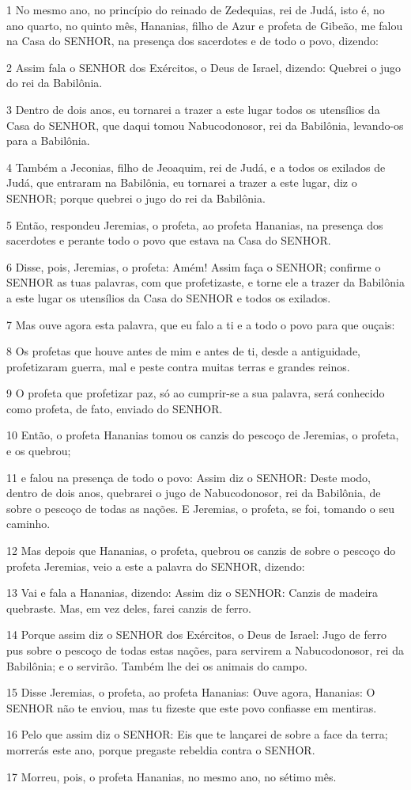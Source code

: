 \par 1 No mesmo ano, no princípio do reinado de Zedequias, rei de Judá, isto é, no ano quarto, no quinto mês, Hananias, filho de Azur e profeta de Gibeão, me falou na Casa do SENHOR, na presença dos sacerdotes e de todo o povo, dizendo:
\par 2 Assim fala o SENHOR dos Exércitos, o Deus de Israel, dizendo: Quebrei o jugo do rei da Babilônia.
\par 3 Dentro de dois anos, eu tornarei a trazer a este lugar todos os utensílios da Casa do SENHOR, que daqui tomou Nabucodonosor, rei da Babilônia, levando-os para a Babilônia.
\par 4 Também a Jeconias, filho de Jeoaquim, rei de Judá, e a todos os exilados de Judá, que entraram na Babilônia, eu tornarei a trazer a este lugar, diz o SENHOR; porque quebrei o jugo do rei da Babilônia.
\par 5 Então, respondeu Jeremias, o profeta, ao profeta Hananias, na presença dos sacerdotes e perante todo o povo que estava na Casa do SENHOR.
\par 6 Disse, pois, Jeremias, o profeta: Amém! Assim faça o SENHOR; confirme o SENHOR as tuas palavras, com que profetizaste, e torne ele a trazer da Babilônia a este lugar os utensílios da Casa do SENHOR e todos os exilados.
\par 7 Mas ouve agora esta palavra, que eu falo a ti e a todo o povo para que ouçais:
\par 8 Os profetas que houve antes de mim e antes de ti, desde a antiguidade, profetizaram guerra, mal e peste contra muitas terras e grandes reinos.
\par 9 O profeta que profetizar paz, só ao cumprir-se a sua palavra, será conhecido como profeta, de fato, enviado do SENHOR.
\par 10 Então, o profeta Hananias tomou os canzis do pescoço de Jeremias, o profeta, e os quebrou;
\par 11 e falou na presença de todo o povo: Assim diz o SENHOR: Deste modo, dentro de dois anos, quebrarei o jugo de Nabucodonosor, rei da Babilônia, de sobre o pescoço de todas as nações. E Jeremias, o profeta, se foi, tomando o seu caminho.
\par 12 Mas depois que Hananias, o profeta, quebrou os canzis de sobre o pescoço do profeta Jeremias, veio a este a palavra do SENHOR, dizendo:
\par 13 Vai e fala a Hananias, dizendo: Assim diz o SENHOR: Canzis de madeira quebraste. Mas, em vez deles, farei canzis de ferro.
\par 14 Porque assim diz o SENHOR dos Exércitos, o Deus de Israel: Jugo de ferro pus sobre o pescoço de todas estas nações, para servirem a Nabucodonosor, rei da Babilônia; e o servirão. Também lhe dei os animais do campo.
\par 15 Disse Jeremias, o profeta, ao profeta Hananias: Ouve agora, Hananias: O SENHOR não te enviou, mas tu fizeste que este povo confiasse em mentiras.
\par 16 Pelo que assim diz o SENHOR: Eis que te lançarei de sobre a face da terra; morrerás este ano, porque pregaste rebeldia contra o SENHOR.
\par 17 Morreu, pois, o profeta Hananias, no mesmo ano, no sétimo mês.

